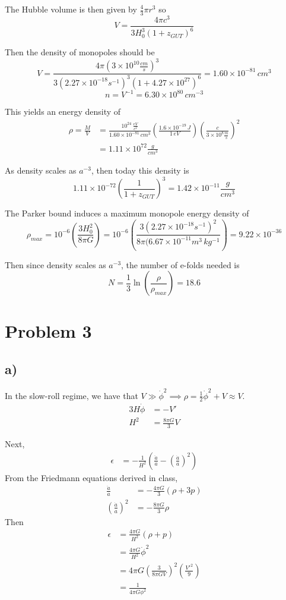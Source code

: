 \documentclass{article}
\begin{document}
The Hubble volume is then given by $\frac{4}{3}\pi r^3$ so
\[V = \frac{4\pi c^3}{3H_0^3(1+z_{GUT})^6}\]

Then the density of monopoles should be 
\[V= \frac{4\pi (3\times 10^{10}\frac{cm}{s})^3}{3(2.27\times 10^{-18}s^{-1})^3(1+4.27\times 10^{27})^6}=1.60\times 10^{-81}\,cm^{3}\]
\[n = V^{-1} = 6.30\times 10^{80}\,cm^{-3}\]

This yields an energy density of 
\begin{align*}
\rho = \frac{M}{V} &= \frac{10^{24}\,\frac{eV}{c^2}}{1.60\times 10^{-81}\,cm^{3}}\left(\frac{1.6\times 10^{-19}\,J}{1\,eV}\right)\left(\frac{c}{3\times 10^8\frac{m}{s}}\right)^2\\
&= 1.11\times 10^{72}\frac{g}{cm^3}
\end{align*}

As density scales as $a^{-3}$, then today this density is
\[1.11\times 10^{-72}\left(\frac{1}{1+z_{GUT}}\right)^3 = 1.42\times 10^{-11}\frac{g}{cm^3}\]

The Parker bound induces a maximum monopole energy density of
\[\rho_{max} = 10^{-6}\left(\frac{3H_0^2}{8\pi G}\right) = 10^{-6}\left(\frac{3(2.27\times 10^{-18}s^{-1})^2}{8\pi (6.67\times 10^{-11}m^3\,kg^{-1}}\right)=9.22\times 10^{-36}\]

Then since density scales as $a^{-3}$, the number of e-folds needed is
\[N = \frac{1}{3}\ln\left(\frac{\rho}{\rho_{max}}\right) = 18.6\]

\section*{Problem 3}
\subsection*{a)}

In the slow-roll regime, we have that $V\gg\dot{\phi}^2\implies \rho=\frac{1}{2}\dot{\phi}^2+V\approx V$.
\begin{align*}
3H\dot{\phi}&= -V'\\
H^2 &= \frac{8\pi G}{3}V
\end{align*}

Next,
\begin{align*}
\epsilon &= -\frac{1}{H^2}\left(\frac{\ddot{a}}{a}-\left(\frac{\dot{a}}{a}\right)^2\right)
\end{align*}
From the Friedmann equations derived in class,
\begin{align*}
\frac{\ddot{a}}{a} &= -\frac{4\pi G}{3}(\rho+3p)\\
\left(\frac{\dot{a}}{a}\right)^2 &= -\frac{8\pi G}{3}\rho
\end{align*}
Then
\begin{align*}
\epsilon &= \frac{4\pi G}{H^2}(\rho+p)\\
&= \frac{4\pi G}{H^2}\dot{\phi}^2\\
&= 4\pi G\left(\frac{3}{8\pi G V}\right)^2\left(\frac{V'^2}{9}\right)\\
&= \frac{1}{4\pi G \phi^2}
\end{align*}
\end{document}
